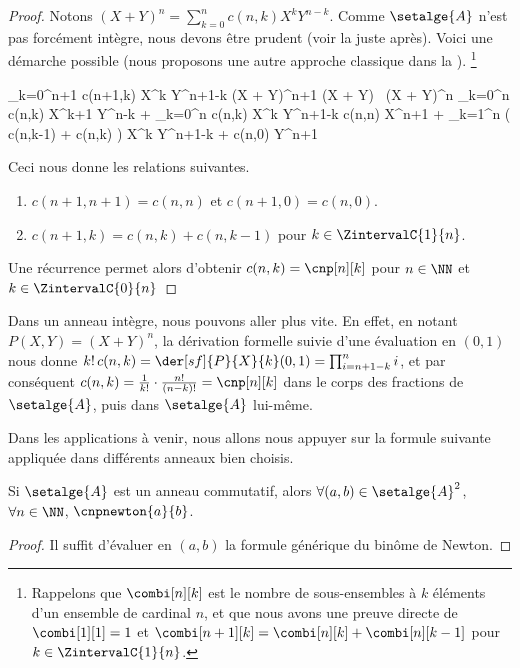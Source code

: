 \begin{proof}
    Notons $(X + Y)^n = \sum_{k=0}^{n} c(n,k) X^k Y^{n-k}$. Comme $\setalge{A}$ n'est pas forcément intègre, nous devons être prudent (voir la  juste après). Voici une démarche possible (nous proposons une autre approche classique dans la ).%
    \footnote{
        Rappelons que $\combi[n][k]$ est le nombre de sous-ensembles à $k$ éléments d'un ensemble de cardinal $n$,
        et que nous avons une preuve directe de
        $\combi[1][1] = 1$
		et
    	$\combi[n+1][k] = \combi[n][k] + \combi[n][k-1]$ pour $k \in \ZintervalC{1}{n}$.
    }

    \begin{stepcalc}[style=ar*]
    	\dsum_{k=0}^{n+1} c(n+1,k) X^k Y^{n+1-k}
	\explnext{}
		(X + Y)^{n+1}
	\explnext{}
		(X + Y) \, (X + Y)^n
	\explnext{}
		  \dsum_{k=0}^{n} c(n,k) X^{k+1} Y^{n-k}
		+ \dsum_{k=0}^{n} c(n,k) X^k     Y^{n+1-k}
	\explnext{}
		  c(n,n) X^{n+1}
		+ \dsum_{k=1}^{n} \big( c(n,k-1) + c(n,k) \big) X^{k} Y^{n+1-k}
		+ c(n,0) Y^{n+1}
    \end{stepcalc}
    
    Ceci nous donne les relations suivantes.
    \begin{enumerate}
    	\item $c(n+1,n+1) = c(n,n)$ et $c(n+1,0) = c(n,0)$.

    	\item $c(n+1,k) = c(n,k) + c(n,k-1)$ pour $k \in \ZintervalC{1}{n}$.
    \end{enumerate}
    
    Une récurrence permet alors d'obtenir
    $c(n,k) = \cnp[n][k]$ pour $n \in \NN$ et $k \in \ZintervalC{0}{n}$
\end{proof}


\begin{remark} \label{bino-id-formal-quick}
    Dans un anneau intègre, nous pouvons aller plus vite.
    En effet,
    en notant $P(X,Y) = (X + Y)^n$,
    la dérivation formelle suivie d'une évaluation en $(0,1)$ nous donne
    $k! \, c(n,k) = \der[sf]{P}{X}{k}(0,1) = \prod_{i=n+1-k}^{n} i$,
    et par conséquent
    $c(n,k) = \frac{1}{k!} \cdot \frac{n!}{(n-k)!} = \cnp[n][k]$ 
    dans le corps des fractions de $\setalge{A}$, 
    puis dans $\setalge{A}$ lui-même.
\end{remark}




Dans les applications à venir, nous allons nous appuyer sur la formule suivante appliquée dans différents anneaux bien choisis.


\begin{fact} \label{bino-id-a-b}
	Si $\setalge{A}$ est un anneau commutatif,
	alors
	$\forall (a, b) \in \setalge{A}^2$,
	$\forall n \in \NN$,
	$\cnpnewton{a}{b}$.
\end{fact}


\begin{proof}
	Il suffit d'évaluer en $(a, b)$ la formule générique du binôme de Newton.
\end{proof}